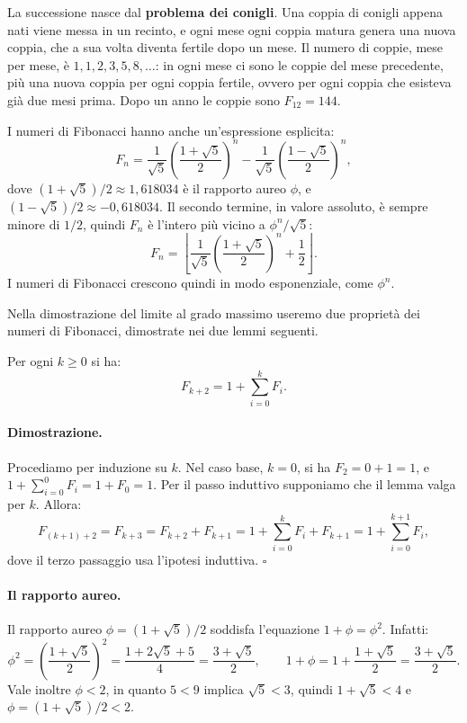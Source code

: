 La successione nasce dal \textbf{problema dei conigli}. Una coppia di conigli appena nati viene messa in un recinto, e ogni mese ogni coppia matura genera una nuova coppia, che a sua volta diventa fertile dopo un mese. Il numero di coppie, mese per mese, è $1, 1, 2, 3, 5, 8, \ldots$: in ogni mese ci sono le coppie del mese precedente, più una nuova coppia per ogni coppia fertile, ovvero per ogni coppia che esisteva già due mesi prima. Dopo un anno le coppie sono $F_{12} = 144$.

\begin{osservazione}
I numeri di Fibonacci hanno anche un'espressione esplicita:
\[
F_n = \frac{1}{\sqrt{5}} \left( \frac{1+\sqrt{5}}{2} \right)^{\!n} - \frac{1}{\sqrt{5}} \left( \frac{1-\sqrt{5}}{2} \right)^{\!n},
\]
dove $(1+\sqrt{5})/2 \approx 1{,}618034$ è il rapporto aureo $\phi$, e $(1-\sqrt{5})/2 \approx -0{,}618034$. Il secondo termine, in valore assoluto, è sempre minore di $1/2$, quindi $F_n$ è l'intero più vicino a $\phi^n/\sqrt{5}$:
\[
F_n = \left\lfloor \frac{1}{\sqrt{5}} \left( \frac{1+\sqrt{5}}{2} \right)^{\!n} + \frac{1}{2} \right\rfloor.
\]
I numeri di Fibonacci crescono quindi in modo esponenziale, come $\phi^n$.
\end{osservazione}

Nella dimostrazione del limite al grado massimo useremo due proprietà dei numeri di Fibonacci, dimostrate nei due lemmi seguenti.

\begin{lemma}\label{lem:hf-somma}
Per ogni $k \ge 0$ si ha:
\[
F_{k+2} = 1 + \sum_{i=0}^{k} F_i.
\]
\end{lemma}

\paragraph{Dimostrazione.}
Procediamo per induzione su $k$. Nel caso base, $k = 0$, si ha $F_2 = 0 + 1 = 1$, e $1 + \sum_{i=0}^{0} F_i = 1 + F_0 = 1$. Per il passo induttivo supponiamo che il lemma valga per $k$. Allora:
\[
F_{(k+1)+2} = F_{k+3} = F_{k+2} + F_{k+1} = 1 + \sum_{i=0}^{k} F_i + F_{k+1} = 1 + \sum_{i=0}^{k+1} F_i,
\]
dove il terzo passaggio usa l'ipotesi induttiva. \hfill $\square$

\paragraph{Il rapporto aureo.}
Il rapporto aureo $\phi = (1+\sqrt{5})/2$ soddisfa l'equazione $1 + \phi = \phi^2$. Infatti:
\[
\phi^2 = \left( \frac{1+\sqrt{5}}{2} \right)^{\!2} = \frac{1 + 2\sqrt{5} + 5}{4} = \frac{3+\sqrt{5}}{2}, \qquad 1 + \phi = 1 + \frac{1+\sqrt{5}}{2} = \frac{3+\sqrt{5}}{2}.
\]
Vale inoltre $\phi < 2$, in quanto $5 < 9$ implica $\sqrt{5} < 3$, quindi $1 + \sqrt{5} < 4$ e $\phi = (1+\sqrt{5})/2 < 2$.

